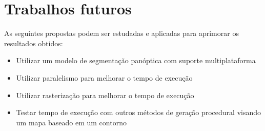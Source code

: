 \section{Trabalhos futuros}

As seguintes propostas podem ser estudadas e aplicadas para aprimorar os resultados obtidos:

\begin{itemize}
    \item Utilizar um modelo de segmentação panóptica com suporte multiplataforma
    \item Utilizar paralelismo para melhorar  o tempo de execução
    \item Utilizar rasterização para melhorar  o tempo de execução
    \item Testar tempo de execução com outros métodos de geração procedural visando um mapa baseado em um contorno
\end{itemize}
